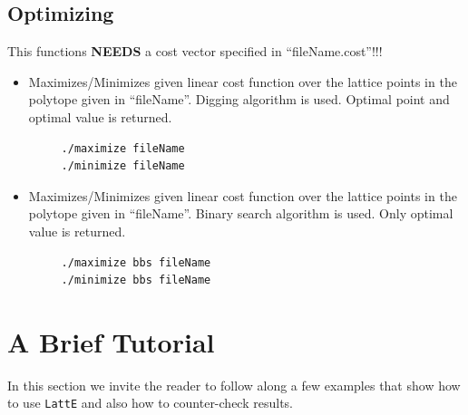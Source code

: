 \documentclass{article}
\begin{document}
\subsection{Optimizing}
This functions {\bf NEEDS} a cost vector specified in ``fileName.cost''!!!
\begin{itemize}
\item Maximizes/Minimizes given linear cost function over the lattice
  points in the polytope given in ``fileName''. Digging algorithm
  \cite{latte3} is used. Optimal point and optimal value is returned. 
\begin{verbatim}
     ./maximize fileName
     ./minimize fileName
\end{verbatim} 
\item Maximizes/Minimizes given linear cost function over the lattice
  points in the polytope given in ``fileName''. Binary search
  algorithm is used. Only optimal value is returned. 
\begin{verbatim}
     ./maximize bbs fileName
     ./minimize bbs fileName
\end{verbatim} 
\end{itemize}
	


\newpage

\section{A Brief Tutorial}
In this section we invite the reader to follow along a few examples
that show how to use {\tt LattE} and also how to counter-check
results.
\end{document}
